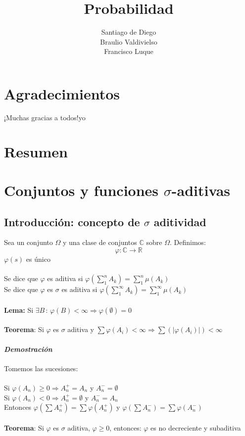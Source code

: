 \documentclass[12pt,a4paper,openright]{book}
\author{Santiago de Diego\\Braulio Valdivielso\\Francisco Luque}
\title{Probabilidad}
\date{}
\begin{document}
\maketitle
\newpage
\chapter*{Agradecimientos} %
 
¡Muchas gracias a todos!yo

\chapter*{Resumen} %

\tableofcontents
\chapter{Conjuntos y funciones $\sigma$-aditivas}
\section{Introducción: concepto de $\sigma$ aditividad}
Sea un conjunto $\Omega$ y una clase de conjuntos $\mathbb{C}$ sobre $\Omega$. Definimos:
$$\varphi : \mathbb{C}\rightarrow \mathbb{R}$$
$\varphi (s)$ es único\\\\
Se dice que $\varphi$ es aditiva si $\varphi(\displaystyle\sum_{1}^{n}A_k)=\displaystyle\sum_1^n\mu(A_k)$\\
Se dice que $\varphi$ es $\sigma$ es aditiva si $\varphi(\displaystyle\sum_1^\infty A_k)=\displaystyle\sum_1^\infty \mu(A_k)$\\\\
\textbf{Lema:} Si $\exists B\, : \, \varphi(B)<\infty \Rightarrow \varphi(\emptyset)=0$\\\\
\textbf{Teorema}: Si $\varphi$ es $\sigma$ aditiva y $\displaystyle\sum\varphi(A_i)<\infty\Rightarrow\displaystyle\sum(\vert \varphi(A_i)\vert)<\infty$\\\\
\textit{\textbf{Demostración}}\\\\
Tomemos las sucesiones: \\\\
Si $\varphi(A_n)\geq 0 \Longrightarrow A_n^{+}=A_n$ y $A_n^{-}=\emptyset$\\
Si $\varphi(A_n)<0 \Longrightarrow A_n^{+}=\emptyset$ y $A_n^{-}=A_n$\\
Entonces $\varphi(\displaystyle\sum A_n^{+})=\displaystyle\sum\varphi(A_n^{+})$ y $\varphi(\displaystyle\sum A_n^{-})=\displaystyle\sum\varphi(A_n^{-})$\\\\
\textbf{Teorema}: Si $\varphi$ es $\sigma$ aditiva, $\varphi\geq 0$, entonces: $\varphi$ es no decreciente y subaditiva
\end{document}
